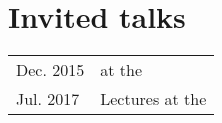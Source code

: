 \documentclass[a4paper]{article}
\newcommand{\dynhref}[2]{%
  \iftoggle{expliciturl}{%
    #2 (\href{#1}{\texttt{\detokenize{#1}}})%
  }{%
    \href{#1}{#2}%
  }%
}
\newenvironment{cvsection}[2]{
  \setlength{\floatsep}{0pt}
  \setlength{\textfloatsep}{0pt}
  \setlength{\intextsep}{0pt}
  \section*{#1}
  \begin{longtable}{lp{#2}}
}{
  \end{longtable}
}
\begin{document}


\begin{cvsection}{Invited talks}{11.2cm}

Dec. 2015 & \dynhref{http://tinyurl.com/h928s3c}{Oral presentation} at the \dynhref{http://fallmeeting.agu.org/2015/}{American Geophysical Union Fall Meeting in 2015}\\

Jul. 2017 & Lectures at the \dynhref{http://data-assimilation.com}{Summer School on Data Assimilation and its applications in Oceanography, Hydrology, Risk \& Safety and Reservoir Engineering in 2017}\\

\end{cvsection}

\end{document}
